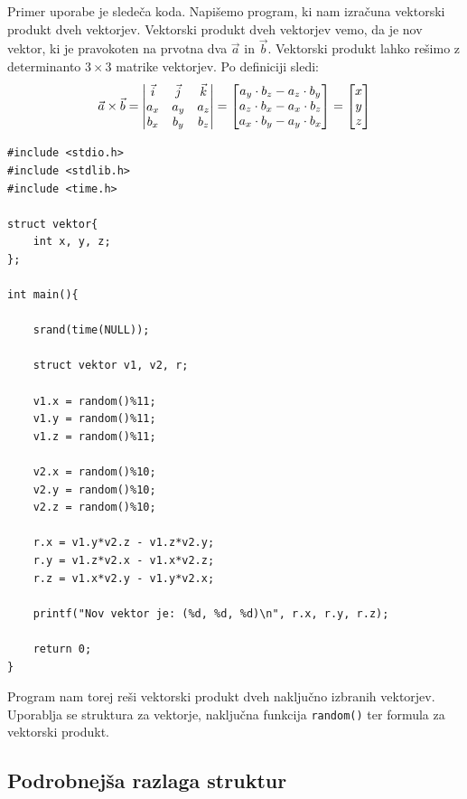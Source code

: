 \documentclass[a4paper, 12pt]{article}
\begin{document}
Primer uporabe  je sledeča koda. Napišemo program, ki nam izračuna vektorski produkt dveh vektorjev. Vektorski produkt dveh vektorjev vemo, da je nov vektor, ki je pravokoten na prvotna dva $\vec{a}$ in $\vec{b}$. Vektorski produkt lahko rešimo z determinanto $3 \times 3$ matrike vektorjev. Po definiciji sledi:
\begin{equation*}
\vec{a} \times \vec{b} = 
\begin{vmatrix}
\vec{i} & \vec{j} & \vec{k} \\
a_x & a_y & a_z\\ 
b_x & b_y &b_z \notag
\end{vmatrix} = 
\begin{bmatrix}
a_y\cdot b_z - a_z\cdot b_y \\
a_z\cdot b_x - a_x\cdot b_z \\
a_x\cdot b_y - a_y\cdot b_x
\end{bmatrix} = 
\begin{bmatrix}
x \\ 
y \\ 
z
\end{bmatrix}
\end{equation*}

\pagebreak

\begin{lstlisting}[caption = Strukture: vektorski produkt]
#include <stdio.h>
#include <stdlib.h>
#include <time.h>

struct vektor{
	int x, y, z;
};

int main(){
	
	srand(time(NULL));
	
	struct vektor v1, v2, r;
	
	v1.x = random()%11;
	v1.y = random()%11;
	v1.z = random()%11;
	
	v2.x = random()%10;
	v2.y = random()%10;
	v2.z = random()%10;
	
	r.x = v1.y*v2.z - v1.z*v2.y;
	r.y = v1.z*v2.x - v1.x*v2.z;
	r.z = v1.x*v2.y - v1.y*v2.x;
	
	printf("Nov vektor je: (%d, %d, %d)\n", r.x, r.y, r.z);
	
	return 0;
}
\end{lstlisting}

Program nam torej reši vektorski produkt dveh naključno izbranih vektorjev. Uporablja se struktura za vektorje, naključna funkcija \lstinline|random()| ter formula za vektorski produkt.

\subsection{Podrobnejša razlaga struktur}
\end{document}
